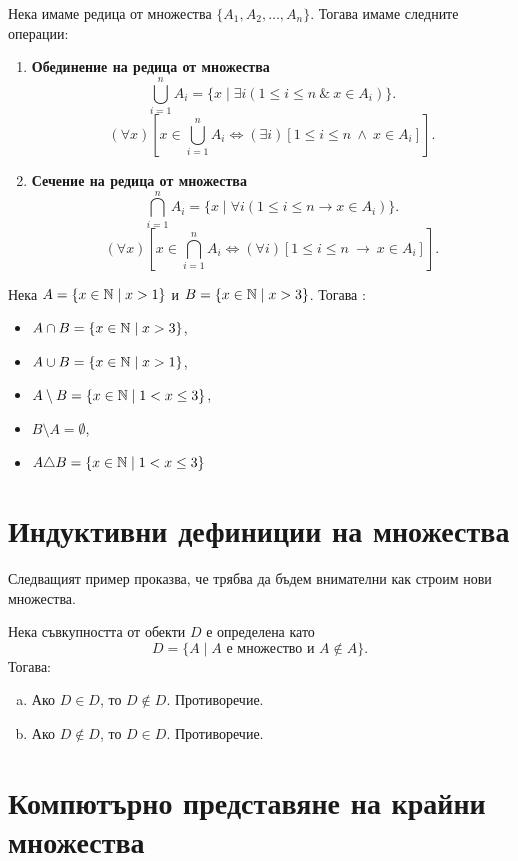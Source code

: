   Нека имаме редица от множества $\{A_1,A_2,\dots,A_n\}$.
  Тогава имаме следните операции:
  \begin{enumerate}[{\bf (I)}]
  \item
    {\bf Обединение на редица от множества}
    \[\bigcup^{n}_{i=1} A_i = \{x \mid \exists i (1\leq i\leq n\ \&\ x\in A_i)\}.\]
    \[(\forall x)[x \in \bigcup^n_{i=1}A_i \iff (\exists i)[1 \leq i \leq n\ \wedge\ x \in A_i]].\]
  \item
    {\bf Сечение на редица от множества}
    \[\bigcap^{n}_{i=1} A_i = \{x \mid \forall i (1\leq i\leq n \rightarrow x\in A_i)\}.\]
    \[(\forall x)[x \in \bigcap^n_{i=1}A_i \iff (\forall i)[1 \leq i \leq n\ \rightarrow\ x \in A_i]].\]
  \end{enumerate}

\begin{example}
  Нека $A = \{x\in\mathbb{N}\mid x > 1\}$ и $B = \{x\in\mathbb{N}\mid x>3\}$. Тогава :
  \begin{itemize}
    \item
      $A\cap B = \{x\in\mathbb{N}\mid x > 3\}$,
    \item
      $A\cup B = \{x\in\mathbb{N}\mid x > 1\}$,
    \item
      $A\setminus B = \{x\in\mathbb{N}\mid 1<x\leq 3\}$,
    \item
      $B\setminus A = \emptyset$,
    \item
      $A\triangle B = \{x\in\mathbb{N}\mid 1<x\leq 3\}$
    \end{itemize}
\end{example}

\section*{Индуктивни дефиниции на множества}

Следващият пример проказва, че трябва да бъдем внимателни как строим нови множества.
\begin{example}
  Нека съвкупността от обекти $D$ е определена като
  \[D = \{A\mid A\mbox{ е множество и } A\not\in A\}.\]
  Тогава:
  \begin{enumerate}[a)]
  \item
    Ако $D \in D$, то $D \not\in D$. Противоречие.
  \item
    Ако $D \not\in D$, то $D \in D$. Противоречие.
  \end{enumerate}
\end{example}

\section*{Компютърно представяне на крайни множества}




